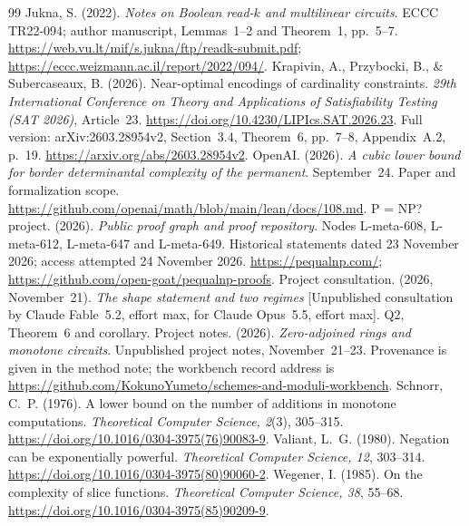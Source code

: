 \documentclass[11pt]{article}
\newcommand{\workbenchurl}{https://github.com/KokunoYumeto/schemes-and-moduli-workbench}
\theoremstyle{definition}
\theoremstyle{remark}
\begin{document}
\begin{thebibliography}{99}
Jukna, S. (2022). \emph{Notes on Boolean read-$k$ and multilinear circuits}. ECCC TR22-094; author manuscript, Lemmas~1--2 and Theorem~1, pp.~5--7. \url{https://web.vu.lt/mif/s.jukna/ftp/readk-submit.pdf}; \url{https://eccc.weizmann.ac.il/report/2022/094/}.
Krapivin, A., Przybocki, B., \& Subercaseaux, B. (2026). Near-optimal encodings of cardinality constraints. \emph{29th International Conference on Theory and Applications of Satisfiability Testing (SAT 2026)}, Article~23. \url{https://doi.org/10.4230/LIPIcs.SAT.2026.23}. Full version: arXiv:2603.28954v2, Section~3.4, Theorem~6, pp.~7--8, Appendix~A.2, p.~19. \url{https://arxiv.org/abs/2603.28954v2}.
OpenAI. (2026). \emph{A cubic lower bound for border determinantal complexity of the permanent}. September~24. Paper and formalization scope. \url{https://github.com/openai/math/blob/main/lean/docs/108.md}.
P = NP? project. (2026). \emph{Public proof graph and proof repository}. Nodes L-meta-608, L-meta-612, L-meta-647 and L-meta-649. Historical statements dated 23 November 2026; access attempted 24 November 2026. \url{https://pequalnp.com/}; \url{https://github.com/open-goat/pequalnp-proofs}.
Project consultation. (2026, November~21). \emph{The shape statement and two regimes} [Unpublished consultation by Claude Fable~5.2, effort max, for Claude Opus~5.5, effort max]. Q2, Theorem~6 and corollary.
Project notes. (2026). \emph{Zero-adjoined rings and monotone circuits}. Unpublished project notes, November~21--23. Provenance is given in the method note; the workbench record address is \url{\workbenchurl}.
Schnorr, C.~P. (1976). A lower bound on the number of additions in monotone computations. \emph{Theoretical Computer Science, 2}(3), 305--315. \url{https://doi.org/10.1016/0304-3975(76)90083-9}.
Valiant, L.~G. (1980). Negation can be exponentially powerful. \emph{Theoretical Computer Science, 12}, 303--314. \url{https://doi.org/10.1016/0304-3975(80)90060-2}.
Wegener, I. (1985). On the complexity of slice functions. \emph{Theoretical Computer Science, 38}, 55--68. \url{https://doi.org/10.1016/0304-3975(85)90209-9}.
\end{thebibliography}
\end{document}
